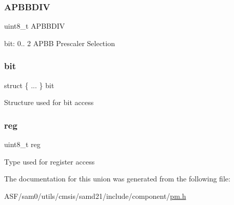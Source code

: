 \subsubsection{\texorpdfstring{APBBDIV}{APBBDIV}}
{\footnotesize\ttfamily uint8\+\_\+t A\+P\+B\+B\+D\+IV}

bit\+: 0.. 2 A\+P\+BB Prescaler Selection \mbox{\label{union_p_m___a_p_b_b_s_e_l___type_aff78f5684f13434e6e2d97f91389247f}} 
\subsubsection{\texorpdfstring{bit}{bit}}
{\footnotesize\ttfamily struct \{ ... \}   bit}

Structure used for bit access \mbox{\label{union_p_m___a_p_b_b_s_e_l___type_a9428adc9af4653a2050e2536b55dec8d}} 
\subsubsection{\texorpdfstring{reg}{reg}}
{\footnotesize\ttfamily uint8\+\_\+t reg}

Type used for register access 

The documentation for this union was generated from the following file\+:\begin{DoxyCompactItemize}
\item 
A\+S\+F/sam0/utils/cmsis/samd21/include/component/\mbox{\hyperlink{component_2pm_8h}{pm.\+h}}\end{DoxyCompactItemize}
